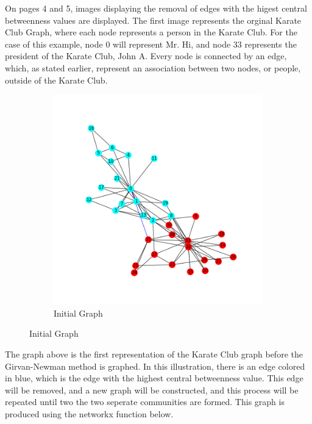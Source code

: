 \documentclass[11pt]{article} %
\begin{document}
On pages 4 and 5, images displaying the removal of edges with the higest central betweenness values are displayed. The first image represents the orginal Karate Club Graph, where each node represents a person in the Karate Club. For the case of this example, node 0 will represent Mr. Hi, and node 33 represents the president of the Karate Club, John A. Every node is connected by an edge, which, as stated earlier, represent an association between two nodes, or people, outside of the Karate Club. 

\begin{figure}[h!]
\begin{center}
\begin{subfigure}[b]{.6\linewidth }
    \includegraphics[width=\linewidth]{../Figures/Iteration1.png}
    \caption{Initial Graph}
\end{subfigure}
\end{center}
\end{figure}

\tabto{2.0cm} The graph above is the first representation of the Karate Club graph before the Girvan-Newman method is graphed. In this illustration, there is an edge colored in blue, which is the edge with the highest central betweenness value. This edge will be removed, and a new graph will be constructed, and this process will be repeated until two the two seperate communities are formed. This graph is produced using the networkx function below.
\end{document}
